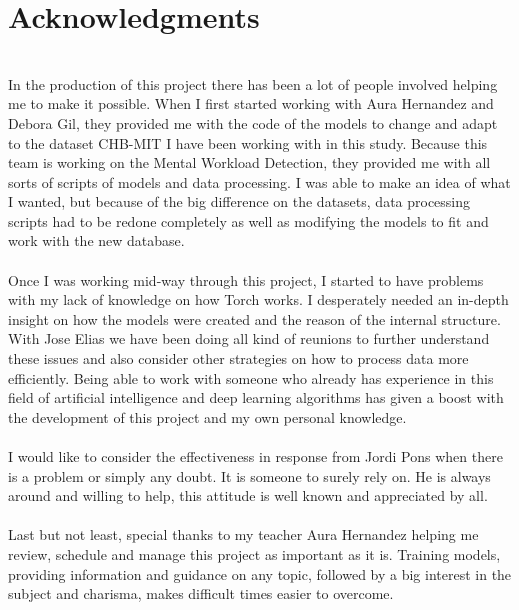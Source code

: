 \section{Acknowledgments}
\leavevmode\\
In the production of this project there has been a lot of people involved helping me to make it possible. When I first started working with Aura Hernandez and Debora Gil, they provided me with the code of the models to change and adapt to the dataset CHB-MIT I have been working with in this study. Because this team is working on the Mental Workload Detection, they provided me with all sorts of scripts of models and data processing. I was able to make an idea of what I wanted, but because of the big difference on the datasets, data processing scripts had to be redone completely as well as modifying the models to fit and work with the new database.
\\\\
Once I was working mid-way through this project, I started to have problems with my lack of knowledge on how Torch works. I desperately needed an in-depth insight on how the models were created and the reason of the internal structure. With Jose Elias we have been doing all kind of reunions to further understand these issues and also consider other strategies on how to process data more efficiently. Being able to work with someone who already has experience in this field of artificial intelligence and deep learning algorithms has given a boost with the development of this project and my own personal knowledge.
\\\\
I would like to consider the effectiveness in response from Jordi Pons when there is a problem or simply any doubt. It is someone to surely rely on. He is always around and willing to help, this attitude is well known and appreciated by all.
\\\\
Last but not least, special thanks to my teacher Aura Hernandez helping me review, schedule and manage this project as important as it is. Training models, providing information and guidance on any topic, followed by a big interest in the subject and charisma, makes difficult times easier to overcome.
\\